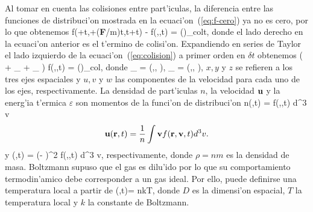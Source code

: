 Al tomar en cuenta las colisiones entre part'iculas, la diferencia entre las funciones de distribuci'on
mostrada en la ecuaci'on~(\ref{eq:f-cero}) ya no es cero, por lo que obtenemos
\BE
\label{eq:colision}
f\left(\vr+\vv \delta t,\vv +(\textbf F/m)\delta t,t+\delta t\right) - f(\vr,\vv,t)  = 
\left(\right)_{col}\delta t,
\EE
donde el lado derecho en la ecuaci'on anterior es el t'ermino de colisi'on.
Expandiendo en series de Taylor el lado izquierdo de la ecuaci'on~(\ref{eq:colision})
a primer orden en $\delta t$ obtenemos
\BE\label{eq:taylor-colision}
\left(
 + \vv \cdot \nabla_{\vr} + \cdot \nabla_{\vv}
\right) 
f(\vr,\vv,t) = \left(\right)_{col},
\EE
donde
\BE
\nabla_{\vr} = \left(,, \right),
\qquad 
\nabla_{\vv} = \left(,, \right),
\EE
$x,y$ y $z$ se refieren a los tres ejes espaciales y $u,v$ y $w$ las componentes de la velocidad para cada uno
de los ejes, respectivamente.
La densidad de part'iculas $n$, la velocidad  $\textbf u$ y la energ'ia t'ermica $\varepsilon$
son momentos de la funci'on de distribuci'on 
\BE \label{eq:masa}
n(\vr,t) = \int f(\vr,\vv,t) d^3 v %
\EE
\begin{equation}\label{eq:momento} 
\vu (\vr,t)=\frac{1}{n} \int \vv f(\vr,\vv,t) d^3 v. %
\end{equation}
y
\BE\label{eq:energia}
\varepsilon (\vr,t) =  \int {} (\vv - \vu)^2 f(\vr,\vv,t) d^3 v,
\EE
respectivamente, 
donde $\rho=nm$ es la densidad de masa. Boltzmann supuso que el gas es dilu'ido por lo que
su comportamiento termodin'amico debe corresponder a un gas ideal. Por ello, puede definirse una
temperatura local a partir de
\BE
\varepsilon (\vr,t)= nkT,
\EE
donde $D$ es la dimensi'on espacial, $T$ la temperatura local y $k$ la constante de Boltzmann.


